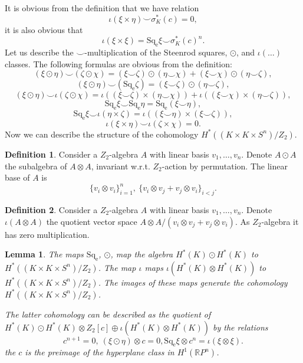\documentclass[12pt,a4paper]{amsart}
\newtheorem{lem}{Lemma}
\theoremstyle{definition}
\newtheorem{defn}{Definition}
\theoremstyle{remark}
\begin{document}
It is obvious from the definition that we have relation
$$
\iota(\xi\times\eta)\smile \sigma_K^*(c) = 0,
$$
it is also obvious that 
$$
\iota(\xi\times\xi) = \operatorname{Sq_e}\xi\smile \sigma_K^*(c)^n.
$$
Let us describe the $\smile$-multiplication of the Steenrod squares, $\odot$, and $\iota(\ldots)$ classes. The following formulas are obvious from the definition:
$$ 
(\xi\odot\eta)\smile(\zeta\odot\chi) = (\xi\smile\zeta)\odot(\eta\smile\chi) + (\xi\smile\chi)\odot(\eta\smile\zeta),
$$
$$
(\xi\odot\eta)\smile(\operatorname{Sq_e}\zeta) = (\xi\smile\zeta)\odot(\eta\smile\zeta),
$$
$$
(\xi\odot\eta)\smile\iota(\zeta\odot\chi) = \iota((\xi\smile\zeta)\times(\eta\smile\chi)) + \iota((\xi\smile\chi)\times(\eta\smile\zeta)),
$$
$$
\operatorname{Sq_e}\xi\smile\operatorname{Sq_e}\eta = \operatorname{Sq_e}(\xi\smile\eta),
$$
$$
\operatorname{Sq_e}\xi\smile \iota(\eta\times\zeta) = \iota((\xi\smile\eta)\times(\xi\smile\zeta)),
$$
$$
\iota(\xi\times\eta)\smile\iota(\zeta\times\chi)=0.
$$
Now we can describe the structure of the cohomology $H^*( (K\times K\times S^n)/Z_2)$.

\begin{defn}
Consider a $Z_2$-algebra $A$ with linear basis $v_1,\ldots, v_n$. Denote $A\odot A$ the subalgebra of $A\otimes A$, invariant w.r.t. $Z_2$-action by permutation. The linear base of $A$ is 
$$
\{v_i\otimes v_i\}_{i=1}^n,\ \{v_i\otimes v_j+v_j\otimes v_i\}_{i<j}. 
$$
\end{defn}

\begin{defn}
Consider a $Z_2$-algebra $A$ with linear basis $v_1,\ldots, v_n$. Denote $\iota(A\otimes A)$ the quotient vector space $A\otimes A/(v_i\otimes v_j + v_j\otimes v_i)$. As $Z_2$-algebra it has zero multiplication.
\end{defn}

\begin{lem}
\label{ext-sq}
The maps $\operatorname{Sq_e}$, $\odot$, map the algebra $H^*(K)\odot H^*(K)$ to $H^*( (K\times K\times S^n)/Z_2)$. The map $\iota$ maps $\iota(H^*(K)\otimes H^*(K))$ to $H^*( (K\times K\times S^n)/Z_2)$. The images of these maps generate the cohomology $H^*( (K\times K\times S^n)/Z_2)$.

The latter cohomology can be described as the quotient of $H^*(K)\odot H^*(K)\otimes Z_2[c]\oplus \iota(H^*(K)\otimes H^*(K))$ by the relations
$$
c^{n+1}=0,\ (\xi\odot\eta)\otimes c = 0, \operatorname{Sq_e}\xi\otimes c^n = \iota(\xi\otimes\xi).
$$ 
the $c$ is the preimage of the hyperplane class in $H^1(\mathbb RP^n)$.
\end{lem}
\end{document}
